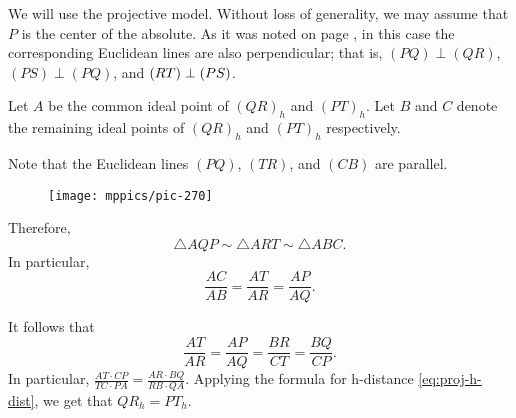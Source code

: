 We will use the projective model.
Without loss of generality, we may assume that $P$ is the center of the absolute.
As it was noted on page \pageref{klein-angles},
in this case the corresponding Euclidean lines are also perpendicular;
that is, $(PQ)\perp (QR)$, $(PS)\perp(PQ)$, and $(RT)\z\perp (PS)$.

Let $A$ be the common ideal point of $(QR)_h$ and $(PT)_h$.
Let $B$ and $C$ denote the remaining ideal points of $(QR)_h$ and $(PT)_h$ respectively.

Note that the Euclidean lines $(PQ)$, $(TR)$, and $(CB)$ are parallel.

\begin{wrapfigure}{o}{55mm}
\vskip-2mm
\centering
\texttt{[image: mppics/pic-270]}
\vskip2mm
\end{wrapfigure}

Therefore, 
\[\triangle AQP\sim \triangle ART \sim\triangle ABC.\]
In particular,
\[\frac{AC}{AB}=\frac{AT}{AR}=\frac{AP}{AQ}.\]

It follows that
\[\frac{AT}{AR}=\frac{AP}{AQ}=\frac{BR}{CT}=\frac{BQ}{CP}.\]
In particular, $\tfrac{AT\cdot CP}{TC\cdot PA}=\tfrac{AR\cdot BQ}{RB\cdot QA}$.
Applying the formula for h-distance \ref{eq:proj-h-dist}, we get that $QR_h=PT_h$.
\qeds
 

